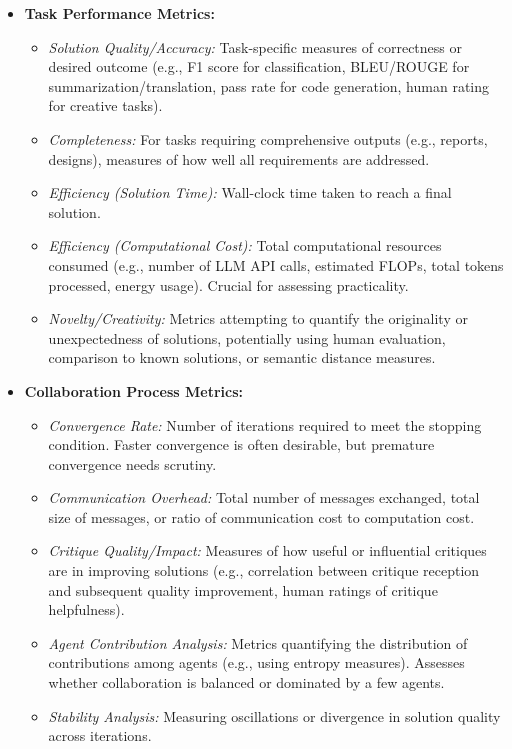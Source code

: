 \documentclass[12pt]{amsart}
\begin{document}
\begin{itemize}[leftmargin=*]
    \item \textbf{Task Performance Metrics:}
        \begin{itemize}
            \item \textit{Solution Quality/Accuracy:} Task-specific measures of correctness or desired outcome (e.g., F1 score for classification, BLEU/ROUGE for summarization/translation, pass rate for code generation, human rating for creative tasks).
            \item \textit{Completeness:} For tasks requiring comprehensive outputs (e.g., reports, designs), measures of how well all requirements are addressed.
            \item \textit{Efficiency (Solution Time):} Wall-clock time taken to reach a final solution.
            \item \textit{Efficiency (Computational Cost):} Total computational resources consumed (e.g., number of LLM API calls, estimated FLOPs, total tokens processed, energy usage). Crucial for assessing practicality.
            \item \textit{Novelty/Creativity:} Metrics attempting to quantify the originality or unexpectedness of solutions, potentially using human evaluation, comparison to known solutions, or semantic distance measures.
        \end{itemize}

    \item \textbf{Collaboration Process Metrics:}
        \begin{itemize}
            \item \textit{Convergence Rate:} Number of iterations required to meet the stopping condition. Faster convergence is often desirable, but premature convergence needs scrutiny.
            \item \textit{Communication Overhead:} Total number of messages exchanged, total size of messages, or ratio of communication cost to computation cost.
            \item \textit{Critique Quality/Impact:} Measures of how useful or influential critiques are in improving solutions (e.g., correlation between critique reception and subsequent quality improvement, human ratings of critique helpfulness).
            \item \textit{Agent Contribution Analysis:} Metrics quantifying the distribution of contributions among agents (e.g., using entropy measures). Assesses whether collaboration is balanced or dominated by a few agents.
            \item \textit{Stability Analysis:} Measuring oscillations or divergence in solution quality across iterations.
        \end{itemize}


\end{itemize}
\end{document}
